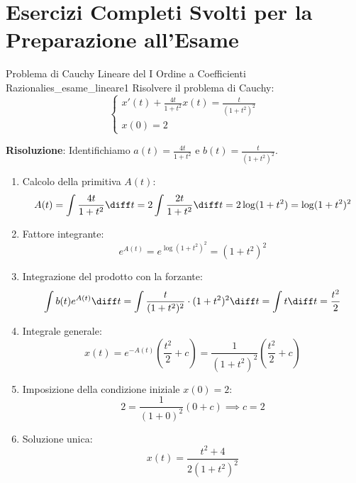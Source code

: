 \newpage

\section{Esercizi Completi Svolti per la Preparazione all'Esame}
\label{sec:esercizi_esame_svolti}

\begin{esempio}{Problema di Cauchy Lineare del I Ordine a Coefficienti Razionali}{es_esame_lineare1}
Risolvere il problema di Cauchy:
\[
    \begin{cases}
        x'(t) + \frac{4t}{1+t^2} x(t) = \frac{t}{(1+t^2)^2} \\
        x(0) = 2
    \end{cases}
\]

\textbf{Risoluzione}:
Identifichiamo $a(t) = \frac{4t}{1+t^2}$ e $b(t) = \frac{t}{(1+t^2)^2}$.
\begin{enumerate}
    \item Calcolo della primitiva $A(t)$:
    \[
        A(t) = \int \frac{4t}{1+t^2} \diff t = 2 \int \frac{2t}{1+t^2} \diff t = 2 \log(1+t^2) = \log(1+t^2)^2
    \]
    \item Fattore integrante:
    \[
        e^{A(t)} = e^{\log(1+t^2)^2} = (1+t^2)^2
    \]
    \item Integrazione del prodotto con la forzante:
    \[
        \int b(t) e^{A(t)} \diff t = \int \frac{t}{(1+t^2)^2} \cdot (1+t^2)^2 \diff t = \int t \diff t = \frac{t^2}{2}
    \]
    \item Integrale generale:
    \[
        x(t) = e^{-A(t)} \left( \frac{t^2}{2} + c \right) = \frac{1}{(1+t^2)^2} \left( \frac{t^2}{2} + c \right)
    \]
    \item Imposizione della condizione iniziale $x(0) = 2$:
    \[
        2 = \frac{1}{(1+0)^2} (0 + c) \implies c = 2
    \]
    \item Soluzione unica:
    \[
        x(t) = \frac{t^2 + 4}{2(1+t^2)^2}
    \]
\end{enumerate}
\end{esempio}

